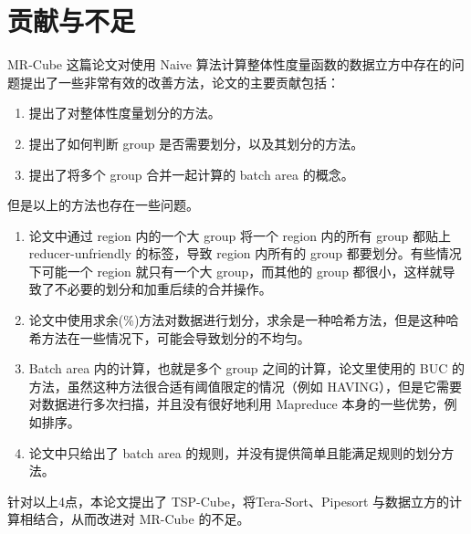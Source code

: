 \section{贡献与不足}

MR-Cube \cite{nandi2011distributed} 这篇论文对使用 Naive 算法计算整体性度量函数的数据立方中存在的问题提出了一些非常有效的改善方法，论文的主要贡献包括：

\begin{enumerate}
\item 提出了对整体性度量划分的方法。
\item 提出了如何判断 group 是否需要划分，以及其划分的方法。
\item 提出了将多个 group 合并一起计算的 batch area 的概念。
\end{enumerate}

但是以上的方法也存在一些问题。

\begin{enumerate}
\item 论文中通过 region 内的一个大 group 将一个 region 内的所有 group 都贴上 reducer-unfriendly 的标签，导致 region 内所有的 group 都要划分。有些情况下可能一个 region 就只有一个大 group，而其他的 group 都很小，这样就导致了不必要的划分和加重后续的合并操作。
\item 论文中使用求余(\%)方法对数据进行划分，求余是一种哈希方法，但是这种哈希方法在一些情况下，可能会导致划分的不均匀。
\item Batch area 内的计算，也就是多个 group 之间的计算，论文里使用的 BUC 的方法，虽然这种方法很合适有阈值限定的情况（例如 HAVING），但是它需要对数据进行多次扫描，并且没有很好地利用 Mapreduce 本身的一些优势，例如排序。
\item 论文中只给出了 batch area 的规则，并没有提供简单且能满足规则的划分方法。
\end{enumerate}

针对以上4点，本论文提出了 TSP-Cube，将Tera-Sort、Pipesort 与数据立方的计算相结合，从而改进对 MR-Cube 的不足。





